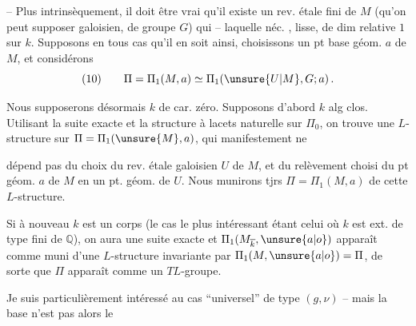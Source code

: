 
 -- Plus intrinsèquement, il doit être vrai qu'il existe un rev. étale fini de $M$ (qu'on peut supposer galoisien, de groupe $G$)  qui    -- laquelle  néc. , lisse, de dim relative $1$ sur $k$. Supposons en tous cas qu'il en soit ainsi, choisissons un pt base géom. $a$ de $M$, et considérons
\[
(10)\qquad \Pi=\Pi_1(M,a)\simeq\Pi_1(\unsure{U|M},G;a)\,.
\]

Nous supposerons désormais $k$ de car. zéro. Supposons d'abord $k$ alg clos. Utilisant la suite exacte
et la  structure à lacets naturelle sur $\Pi_0$, on trouve une $L$-structure sur $\Pi=\Pi_1(\unsure{M},a)$, qui manifestement ne


dépend pas du choix du rev. étale  galoisien $U$ de $M$, et du relèvement choisi du pt géom. $a$ de $M$ en un pt. géom. de $U$. Nous munirons tjrs  $\Pi=\Pi_1(M,a)$ de cette $L$-structure.

Si à nouveau $k$ est un corps  (le cas le plus intéressant étant celui où $k$ est ext. de type fini de $\mathbb{Q}$), on aura une suite exacte
et $\Pi_1(M_{\overline{k}},\unsure{a|o})$ apparaît comme muni d'une $L$-structure invariante par $\Pi_1(M,\unsure{a|o})=\Pi$, de sorte que $\Pi$ apparaît comme un $TL$-groupe.

Je suis particulièrement intéressé au cas ``universel'' de type $(g,\nu)$ -- mais la base  n'est pas alors le


